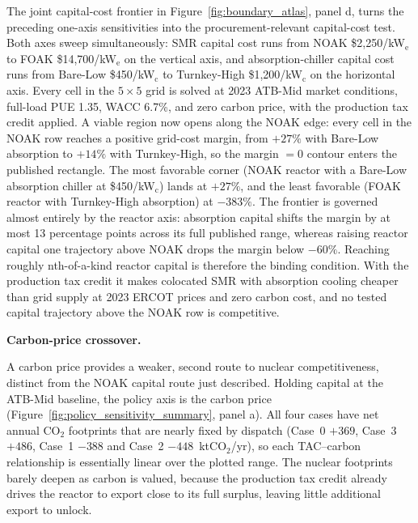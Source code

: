 \documentclass[a4paper,fleqn]{cas-sc}
\newcommand{\runinhead}[1]{\par\smallskip\noindent\textbf{#1.}\quad}
\begin{document}
The joint capital-cost frontier in Figure~\ref{fig:boundary_atlas}, panel d, turns the preceding one-axis sensitivities into the procurement-relevant capital-cost test. Both axes sweep simultaneously: SMR capital cost runs from NOAK \$2{,}250/kW$_\mathrm{e}$ to FOAK \$14{,}700/kW$_\mathrm{e}$ on the vertical axis, and absorption-chiller capital cost runs from Bare-Low \$450/kW$_\mathrm{c}$ to Turnkey-High \$1{,}200/kW$_\mathrm{c}$ on the horizontal axis. Every cell in the $5 \times 5$ grid is solved at 2023 ATB-Mid market conditions, full-load PUE 1.35, WACC 6.7\%, and zero carbon price, with the production tax credit applied. A viable region now opens along the NOAK edge: every cell in the NOAK row reaches a positive grid-cost margin, from $+27\%$ with Bare-Low absorption to $+14\%$ with Turnkey-High, so the margin $=0$ contour enters the published rectangle. The most favorable corner (NOAK reactor with a Bare-Low absorption chiller at \$450/kW$_\mathrm{c}$) lands at $+27\%$, and the least favorable (FOAK reactor with Turnkey-High absorption) at $-383\%$. The frontier is governed almost entirely by the reactor axis: absorption capital shifts the margin by at most 13 percentage points across its full published range, whereas raising reactor capital one trajectory above NOAK drops the margin below $-60\%$. Reaching roughly nth-of-a-kind reactor capital is therefore the binding condition. With the production tax credit it makes colocated SMR with absorption cooling cheaper than grid supply at 2023 ERCOT prices and zero carbon cost, and no tested capital trajectory above the NOAK row is competitive.

\runinhead{Carbon-price crossover}
\label{sec:results:carbon}

A carbon price provides a weaker, second route to nuclear competitiveness, distinct from the NOAK capital route just described. Holding capital at the ATB-Mid baseline, the policy axis is the carbon price (Figure~\ref{fig:policy_sensitivity_summary}, panel a). All four cases have net annual CO$_2$ footprints that are nearly fixed by dispatch (Case~0 $+369$, Case~3 $+486$, Case~1 $-388$ and Case~2 $-448$~ktCO$_2$/yr), so each TAC--carbon relationship is essentially linear over the plotted range. The nuclear footprints barely deepen as carbon is valued, because the production tax credit already drives the reactor to export close to its full surplus, leaving little additional export to unlock.
\end{document}
